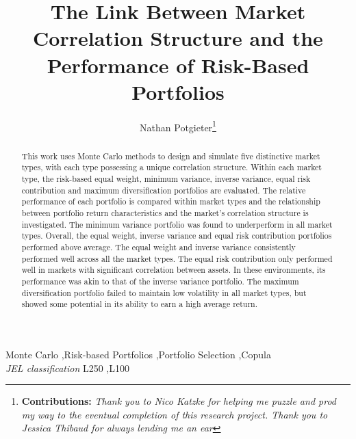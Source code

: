 \documentclass[11pt,preprint, authoryear]{elsarticle}
\numberwithin{equation}{section}
\numberwithin{figure}{section}
\numberwithin{table}{section}
\let\rmarkdownfootnote\footnote%
\def\footnote{\protect\rmarkdownfootnote}
\begin{document}
\begin{frontmatter}  %

\title{The Link Between Market Correlation Structure and the Performance of
Risk-Based Portfolios}





\author[Add1]{Nathan Potgieter\footnote{\textbf{Contributions:} \newline \emph{Thank
  you to Nico Katzke for helping me puzzle and prod my way to the
  eventual completion of this research project. Thank you to Jessica
  Thibaud for always lending me an ear}}}





\address[Add1]{Stellenbosch University, Stellenbosch, South Africa}


\begin{abstract}
\small{
This work uses Monte Carlo methods to design and simulate five
distinctive market types, with each type possessing a unique correlation
structure. Within each market type, the risk-based equal weight, minimum
variance, inverse variance, equal risk contribution and maximum
diversification portfolios are evaluated. The relative performance of
each portfolio is compared within market types and the relationship
between portfolio return characteristics and the market's correlation
structure is investigated. The minimum variance portfolio was found to
underperform in all market types. Overall, the equal weight, inverse
variance and equal risk contribution portfolios performed above average.
The equal weight and inverse variance consistently performed well across
all the market types. The equal risk contribution only performed well in
markets with significant correlation between assets. In these
environments, its performance was akin to that of the inverse variance
portfolio. The maximum diversification portfolio failed to maintain low
volatility in all market types, but showed some potential in its ability
to earn a high average return.
}
\end{abstract}

\vspace{1cm}

\begin{keyword}
\footnotesize{
Monte Carlo \sep Risk-based Portfolios \sep Portfolio Selection
\sep Copula \\ \vspace{0.3cm}
\textit{JEL classification} L250 \sep L100
}
\end{keyword}
\vspace{0.5cm}
\end{frontmatter}
\end{document}
